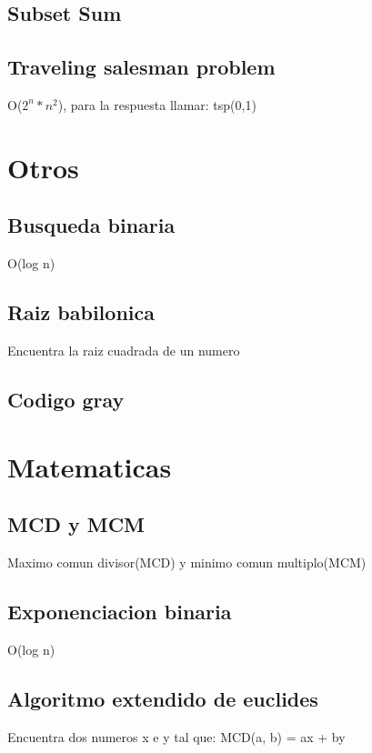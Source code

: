 \documentclass[10pt,landscape,twocolumn,a4paper,notitlepage]{article}
\newcommand\cppfile[2][]{

}
\begin{document}
			\subsection{Subset Sum}
			\cppfile[8-20]{programacion_dinamica/Subset_Sum.cpp}
			\subsection{Traveling salesman problem}
			O($2^{n}*n^{2}$), para la respuesta llamar: tsp(0,1)
			\cppfile[7-22]{programacion_dinamica/traveling_salesman_problem.cpp}
		
		\section{Otros}
			\subsection{Busqueda binaria}
			O(log n)
			\cppfile[7-22]{otros/busqueda_binaria.cpp}
			\subsection{Raiz babilonica}
			Encuentra la raiz cuadrada de un numero
			\cppfile[4-12]{otros/raiz_babilonica.cpp}
			\subsection{Codigo gray}
			\cppfile[5-14]{otros/codigo_gray.cpp}
			
		\section{Matematicas}
			\subsection{MCD y MCM}
			Maximo comun divisor(MCD) y minimo comun multiplo(MCM)
			\cppfile[5-11]{matematicas/MCD_y_MCM.cpp}
			\subsection{Exponenciacion binaria}
			O(log n)
			\cppfile[4-15]{matematicas/exponenciacion_binaria.cpp}
			\subsection{Algoritmo extendido de euclides}
			Encuentra dos numeros x e y tal que: MCD(a, b) = ax + by
			\cppfile[5-24]{matematicas/algoritmo_extendido_de_euclides.cpp}
\end{document}
